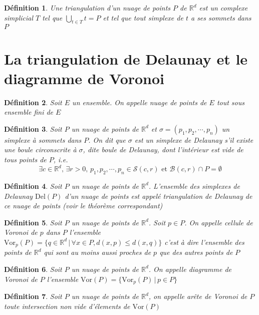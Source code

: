 \documentclass{report}
\newcommand{\R}{\mathbb{R}}
\newcommand{\Vor}{\mathrm{Vor}}
\newcommand{\Del}{\mathrm{Del}}
\newtheorem{definition}{Définition}
\theoremstyle{remark}
\begin{document}
\begin{definition}
	Une \textnormal{triangulation} d'un nuage de points $P$ de $\R^d$ est un complexe simplicial $T$ tel que $\bigcup\limits_{t\in T}t = P$ et tel que tout simplexe de $t$ a ses sommets dans $P$
\end{definition}

\section{La triangulation de Delaunay et le diagramme de Voronoi}
\begin{definition}
	Soit $E$ un ensemble. On appelle \textnormal{nuage de points} de $E$ tout sous ensemble fini de $E$
\end{definition}

\begin{definition}
	Soit $P$ un nuage de points de $\R^d$ et $\sigma = (p_1, p_2, \cdots, p_n)$ un simplexe à sommets dans $P$. On dit que $\sigma$ est un \textnormal{simplexe de Delaunay} s'il existe une boule circonscrite à $\sigma$, dite \textnormal{boule de Delaunay}, dont l'intérieur est vide de tous points de $P$, i.e.
	$$\exists c\in \R^d, \, \exists r > 0, \, p_1, p_2, \cdots, p_n \in \mathcal S(c, r) \text{ et }\mathcal B(c, r)\cap P = \emptyset$$
\end{definition}

\begin{definition}
	Soit $P$ un nuage de points de $\R^d$. L'ensemble des simplexes de Delaunay $\Del(P)$ d'un nuage de points est appelé \textnormal{triangulation de Delaunay} de ce nuage de points (voir le théorème correspondant)
\end{definition}

\begin{definition}
	Soit $P$ un nuage de points de $\R^d$. Soit $p\in P$. On appelle \textnormal{cellule de Voronoi} de $p$ dans $P$ l'ensemble $\Vor_p(P) = \{q\in \R^d\,|\,\forall x\in P, d(x, p) \leq d(x, q)\}$ c'est à dire l'ensemble des points de $\R^d$ qui sont au moins aussi proches de $p$ que des autres points de $P$
\end{definition}

\begin{definition}
	Soit $P$ un nuage de points de $\R^d$. On appelle \textnormal{diagramme de Voronoi} de $P$ l'ensemble $\Vor(P) = \{\Vor_p(P)\,|\,p\in P\}$
\end{definition}

\begin{definition}
	Soit $P$ un nuage de points de $\R^d$, on appelle \textnormal{arête de Voronoi} de $P$ toute intersection non vide d'élements de $\Vor(P)$
\end{definition}
\end{document}
